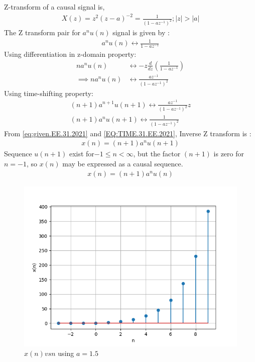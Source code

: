 \documentclass[journal,12pt,twocolumn]{IEEEtran}
\theoremstyle{remark}
\begin{document}
Z-transform of a causal signal is, 
\begin{align}
    X(z) = z^2(z - a)^{-2} = \frac{1}{(1 - az^{-1})^2};|z| > |a|\label{eq:given.EE.31.2021}
\end{align}
The Z transform pair for $a^nu(n)$ signal is given by :
\begin{align}
    a^nu(n) \longleftrightarrow \frac{1}{1 - az^{-1}}
\end{align}
Using differentiation in z-domain property:
\begin{align}
    na^nu(n) &\longleftrightarrow -z\frac{d}{dz}\left(\frac{1}{1 - az^{-1}}\right) \\
     \implies    na^nu(n) &\longleftrightarrow \frac{az^{-1}}{(1 - az^{-1})^2}
\end{align}
Using time-shifting property:
\begin{align}
  (n + 1)a^{n + 1}u(n + 1) \longleftrightarrow \frac{az^{-1}}{(1 - az^{-1})^2}z\\
  (n + 1)a^nu(n + 1) \longleftrightarrow \frac{1}{(1 - az^{-1})^2}\label{EQ:TIME.31.EE.2021}
\end{align}
From \eqref{eq:given.EE.31.2021} and \eqref{EQ:TIME.31.EE.2021}, Inverse Z transform is :
\begin{align}
    x(n) = (n + 1)a^nu(n + 1)
\end{align}
Sequence \(u(n + 1)\) exist for\(-1 \leq n < \infty\), but the factor \((n + 1)\) is zero for \(n = -1\), so \(x(n)\) may be expressed as a causal sequence. 
\begin{align}
    x(n) = (n + 1)a^nu(n)
\end{align}



\begin{figure}[htbp]
    \centering
    \includegraphics[width = \columnwidth]{figs/transform.png}
	\caption{$x(n) vs n $ using $a = 1.5$}
    \label{fig:graph1.41.IN.2022}
\end{figure}

% 
\end{document}
